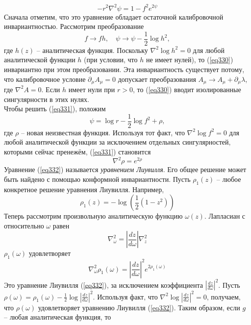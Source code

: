 \documentclass[12pt]{article}
\theoremstyle{definition}
\begin{document}
\begin{equation}\label{eq331}
    -r^2\nabla^2\psi=1-f^2e^{2\psi}
\end{equation}
Сначала отметим, что это уравнение обладает остаточной калибровочной инвариантностью. Рассмотрим преобразование
\begin{equation}\label{eq330}
    f\rightarrow fh,\quad\psi\rightarrow\psi-\frac{1}{2}\log h^2,
\end{equation}
где $h(z)$ -- аналитическая функция. Поскольку $\nabla^2\log h^2=0$ для любой аналитической функции $h$ (при условии, что $h$ не имеет нулей), то (\ref{eq330}) инвариантно при этом преобразовании. Эта инвариантность существует потому, что калибровочное условие $\partial_\mu A_\mu=0$ допускает преобразования $A_\mu\rightarrow A_\mu+\partial_\mu\lambda$, где $\nabla^2A=0$. Если $h$ имеет нули при $r>0$, то (\ref{eq330}) вводит изолированные сингулярности в этих нулях.\\
Чтобы решить (\ref{eq331}), положим 
\begin{equation}
    \psi=\log r-\frac{1}{2}\log f^2+\rho,
\end{equation}
где $\rho$ -- новая неизвестная функция. Используя тот факт, что $\nabla^2\log f^2=0$ для любой аналитической функции за исключением отдельных сингулярностей, которыми сейчас пренежём, (\ref{eq331}) становится
\begin{equation}\label{eq332}
    \nabla^2\rho=e^{2\rho}
\end{equation}
Уравнение (\ref{eq332}) называется \textit{уравнением Лиувилля}. Его общее решение может быть найдено с помощью конформной инвариантности. Пусть $\rho_1(z)$ -- любое конкретное решение уравнения Лиувилля. Например,
\begin{equation}
    \rho_1(z)=-\log\left(\frac{1}{2}(1-z^2)\right)
\end{equation}
Теперь рассмотрим произвольную аналитическую функцию $\omega(z)$. Лапласиан с относительно $\omega$ равен
\begin{equation}
    \nabla^2_\omega=\left|\frac{dz}{d\omega}\right|\nabla_z^2
\end{equation}
$\rho_1(\omega)$ удовлетворяет
\begin{equation}
    \nabla_\omega^2\rho_1(\omega)=\left|\frac{dz}{d\omega}\right|^2e^{2\rho_1(\omega)}
\end{equation}
Это уравнение Лиувилля (\ref{eq332}), за исключением коэффициента $\left|\frac{dz}{d\omega}\right|^2$. Пусть $\rho(\omega)=\rho_1(\omega)-\frac{1}{2}\log\left|\frac{dz}{d\omega}\right|^2$. Используя факт, что $\nabla^2\log\left|\frac{dz}{d\omega}\right|^2 = 0$, получаем, что $\rho(\omega)$ удовлетворяет уравнению Лиувилля (\ref{eq332}). Таким образом, если $g$ -- любая аналитическая функция, то
\end{document}
